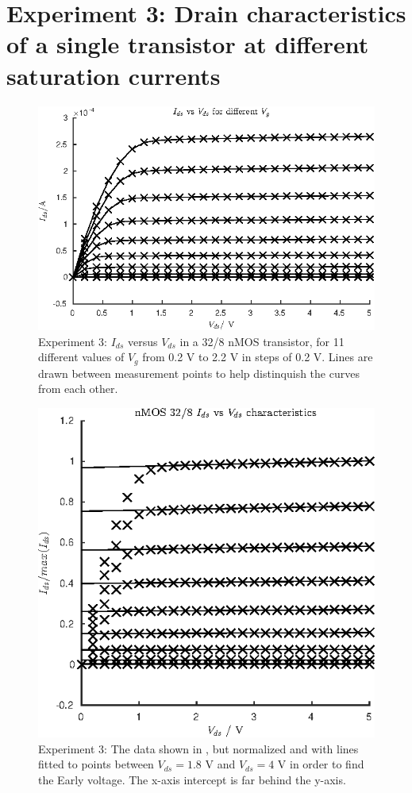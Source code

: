 \section{Experiment 3: Drain characteristics of a single transistor at different saturation currents}
\begin{figure}[!htb]
    \center
    \includegraphics{ex3.eps}
    \caption{Experiment 3: \(I_{ds}\) versus \(V_{ds}\) in a 32/8 nMOS transistor, for 11 different values of \(V_g\) from 0.2 V to 2.2 V in steps of 0.2 V. 
    Lines are drawn between measurement points to help distinquish the curves from each other.}
    \label{fig:ex3}
\end{figure}
\begin{figure}[!htb]
    \center
    \includegraphics{ex3-2.eps}
    \caption{Experiment 3: The data shown in , but normalized and with lines fitted to points between \(V_{ds} = 1.8\) V and \(V_{ds} = 4\) V in order to find the Early voltage.
    The x-axis intercept is far behind the y-axis.}
    \label{fig:ex3-2}
\end{figure}
